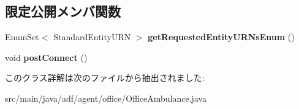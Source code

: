 \subsection*{限定公開メンバ関数}
\begin{DoxyCompactItemize}
\item 
\hypertarget{classadf_1_1agent_1_1office_1_1OfficeAmbulance_a1336aa3b61f97061b5bbc096667ac535}{}\label{classadf_1_1agent_1_1office_1_1OfficeAmbulance_a1336aa3b61f97061b5bbc096667ac535} 
Enum\+Set$<$ Standard\+Entity\+U\+RN $>$ {\bfseries get\+Requested\+Entity\+U\+R\+Ns\+Enum} ()
\item 
\hypertarget{classadf_1_1agent_1_1office_1_1OfficeAmbulance_a3202ac1379e3a96a4ed80b233d8556c3}{}\label{classadf_1_1agent_1_1office_1_1OfficeAmbulance_a3202ac1379e3a96a4ed80b233d8556c3} 
void {\bfseries post\+Connect} ()
\end{DoxyCompactItemize}


このクラス詳解は次のファイルから抽出されました\+:\begin{DoxyCompactItemize}
\item 
src/main/java/adf/agent/office/Office\+Ambulance.\+java\end{DoxyCompactItemize}
